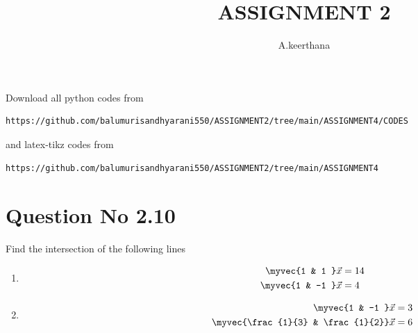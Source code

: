\documentclass[journal,12pt,twocolumn]{IEEEtran}
\begin{document}
     \def\rightbox#1{\makebox[0in][r]{#1}}
     \def\centbox#1{\makebox[0in]{#1}}
     \def\topbox#1{\raisebox{-\baselineskip}[0in][0in]{#1}}
     \def\midbox#1{\raisebox{-0.5\baselineskip}[0in][0in]{#1}}
\vspace{3cm}
\title{ASSIGNMENT 2}
\author{A.keerthana}
\maketitle
\newpage
\bigskip
\renewcommand{\thefigure}{\theenumi}
\renewcommand{\thetable}{\theenumi}
Download all python codes from 
\begin{lstlisting}
https://github.com/balumurisandhyarani550/ASSIGNMENT2/tree/main/ASSIGNMENT4/CODES
\end{lstlisting}
%
and latex-tikz codes from 
%
\begin{lstlisting}
https://github.com/balumurisandhyarani550/ASSIGNMENT2/tree/main/ASSIGNMENT4
\end{lstlisting}
%
\section{Question No 2.10}
Find the intersection of the following lines
%
\begin{enumerate}
\item
\begin{align}
\begin{split}
\myvec{1 & 1 }\vec{x}&=14
\\
\myvec{1 & -1 }\vec{x}&=4 \label{1.0.1}
\end{split}
\end{align}
\item
\begin{align}
\begin{split}
\myvec{1 & -1 }\vec{x}&=3
\\
\myvec{\frac{1}{3} & \frac{1}{2}}\vec{x}&=6 \label{1.0.2}
\end{split}
\end{align}
\end{enumerate}
%
\end{document}
